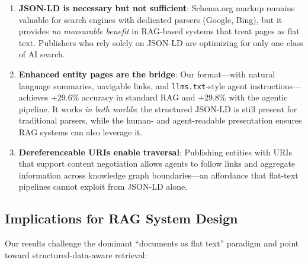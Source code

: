 \documentclass[runningheads]{llncs}
\begin{document}
\begin{enumerate}
    \item \textbf{JSON-LD is necessary but not sufficient}: Schema.org
          markup remains valuable for search engines with dedicated
          parsers (Google, Bing), but it provides \emph{no measurable
          benefit} in RAG-based systems that treat pages as flat text.
          Publishers who rely solely on JSON-LD are optimizing for
          only one class of AI search.
    \item \textbf{Enhanced entity pages are the bridge}: Our format---with
          natural language summaries, navigable links, and
          \texttt{llms.txt}-style agent instructions---achieves
          +29.6\% accuracy in standard RAG and +29.8\% with the
          agentic pipeline. It works \emph{in both worlds}: the structured
          JSON-LD is still present for traditional parsers, while the
          human- and agent-readable presentation ensures RAG systems
          can also leverage it.
    \item \textbf{Dereferenceable URIs enable traversal}: Publishing
          entities with URIs that support content negotiation allows
          agents to follow links and aggregate information across
          knowledge graph boundaries---an affordance that flat-text
          pipelines cannot exploit from JSON-LD alone.
\end{enumerate}

\subsection{Implications for RAG System Design}

Our results challenge the dominant ``documents as flat text'' paradigm
and point toward structured-data-aware retrieval:
\end{document}
